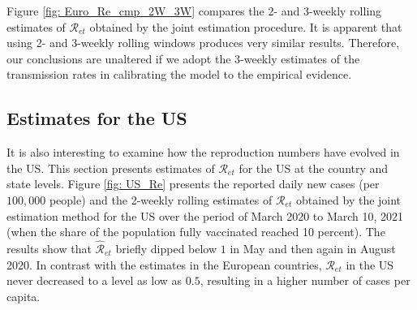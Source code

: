 \documentclass[12pt]{article}
\begin{document}
\begin{figure}[tp]
\begin{footnotesize}
\end{footnotesize}%
%

\end{figure}%


Figure \ref{fig: Euro_Re_cmp_2W_3W} compares the 2- and 3-weekly rolling
estimates of $\mathcal{R}_{et}$ obtained by the joint estimation procedure. It
is apparent that using 2- and 3-weekly rolling windows produces very similar
results. Therefore, our conclusions are unaltered if we adopt the 3-weekly
estimates of the transmission rates in calibrating the model to the empirical evidence.

\subsection{Estimates for the US\label{Sup: empirical_Re_US}}

It is also interesting to examine how the reproduction numbers have evolved in
the US. This section presents estimates of $\mathcal{R}_{et}$ for the US at
the country and state levels. Figure \ref{fig: US_Re} presents the reported
daily new cases (per $100,000$ people) and the 2-weekly rolling estimates of
$\mathcal{R}_{et}$ obtained by the joint estimation method for the US over the
period of March 2020 to March 10, 2021 (when the share of the population fully
vaccinated reached 10 percent). The results show that $\mathcal{\hat{R}}_{et}$
briefly dipped below $1$ in May and then again in August 2020. In contrast
with the estimates in the European countries, $\mathcal{R}_{et}$ in the US
never decreased to a level as low as $0.5$, resulting in a higher number of
cases per capita.%
\end{document}
